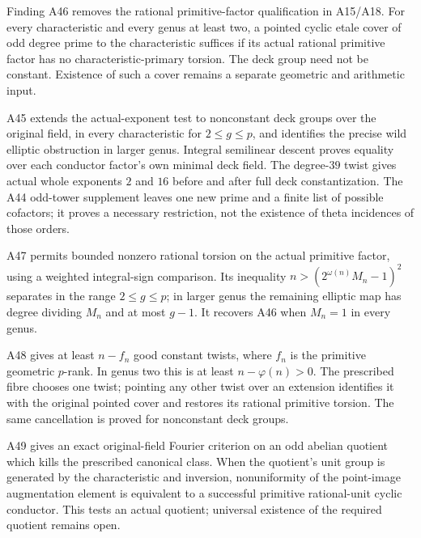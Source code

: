 Finding A46 removes the rational primitive-factor qualification in A15/A18.
For every characteristic and every genus at least two, a pointed cyclic
etale cover of odd degree prime to the characteristic suffices if its
actual rational primitive factor has no characteristic-primary torsion.
The deck group need not be constant. Existence of such a cover remains
a separate geometric and arithmetic input.

A45 extends the actual-exponent test to nonconstant deck groups over the
original field, in every characteristic for $2\le g\le p$, and identifies
the precise wild elliptic obstruction in larger genus. Integral semilinear
descent proves equality over each conductor factor's own minimal deck field.
The degree-$39$ twist gives actual whole exponents $2$ and $16$ before and
after full deck constantization. The A44 odd-tower supplement leaves one
new prime and a finite list of possible cofactors; it proves a necessary
restriction, not the existence of theta incidences of those orders.

A47 permits bounded nonzero rational torsion on the actual primitive
factor, using a weighted integral-sign comparison. Its inequality
$n>(2^{\omega(n)}M_n-1)^2$ separates in the range $2\le g\le p$;
in larger genus the remaining elliptic map has degree dividing $M_n$
and at most $g-1$. It recovers A46 when $M_n=1$ in every genus.

A48 gives at least $n-f_n$ good constant twists, where $f_n$ is the
primitive geometric $p$-rank. In genus two this is at least
$n-\varphi(n)>0$. The prescribed fibre chooses one twist;
pointing any other twist over an extension identifies it with the
original pointed cover and restores its rational primitive torsion.
The same cancellation is proved for nonconstant deck groups.

A49 gives an exact original-field Fourier criterion on an odd abelian
quotient which kills the prescribed canonical class. When the quotient's
unit group is generated by the characteristic and inversion, nonuniformity
of the point-image augmentation element is equivalent to a successful
primitive rational-unit cyclic conductor. This tests an actual quotient;
universal existence of the required quotient remains open.

